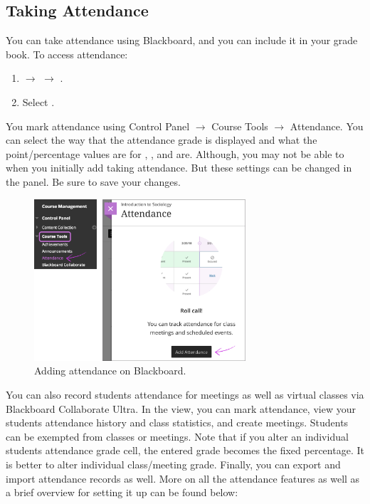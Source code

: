 \subsection{Taking Attendance}

You can take attendance using Blackboard, and you can include it in your grade book. To access attendance:

	\begin{enumerate}[1.]
	\item {} $\to$  $\to$ .
	\item Select .
	\end{enumerate}

You mark attendance using Control Panel $\to$ Course Tools $\to$ Attendance. You can select the way that the attendance grade is displayed and what the point/percentage values are for , , and  are. Although, you may not be able to when you initially add taking attendance. But these settings can be changed in the  panel. Be sure to save your changes. 

	\begin{figure}[!ht]
	\centering
	\includegraphics[width=0.7\textwidth]{sections/blackboard/images/learn_orig_instr_attendance_first_access_1_1.png}
	\caption{Adding attendance on Blackboard.}
	\end{figure}

You can also record students attendance for meetings as well as virtual classes via Blackboard Collaborate Ultra. In the  view, you can mark attendance, view your students attendance history and class statistics, and create meetings. Students can be exempted from classes or meetings. Note that if you alter an individual students attendance grade cell, the entered grade becomes the fixed percentage. It is better to alter individual class/meeting grade. Finally, you can export and import attendance records as well. More on all the attendance features as well as a brief overview for setting it up can be found below:

